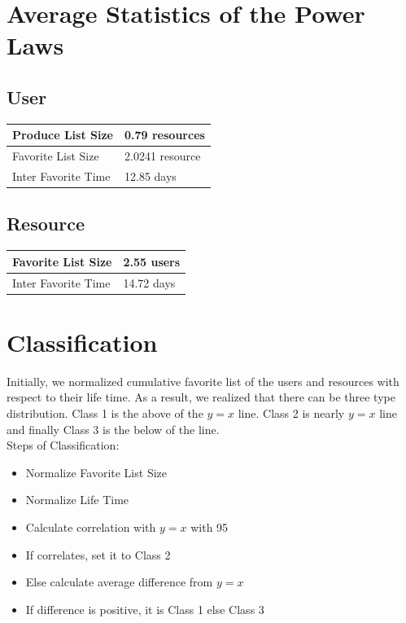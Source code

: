 \documentclass[12pt,a4paper]{report}
\begin{document}
	\clearpage

	\section{Average Statistics of the Power Laws}

	\subsection{User}

	\begin{center}
	\begin{tabular}{|p{5cm}|p{5cm}|}
	\hline
	Produce List Size & 0.79 resources\\
	\hline
	Favorite List Size & 2.0241 resource\\
	\hline
	Inter Favorite Time & 12.85 days\\
	\hline
	\end{tabular}
	\end{center}

	\subsection{Resource}

	\begin{center}
	\begin{tabular}{|p{5cm}|p{5cm}|}
	\hline
	Favorite List Size & 2.55 users\\
	\hline
	Inter Favorite Time & 14.72 days\\
	\hline
	\end{tabular}
	\end{center}	

	\section{Classification}

	\par \hspace{0.6cm} Initially, we normalized cumulative favorite list of the users and resources with respect to their life time. As a result, we realized that there can be three type distribution. Class 1 is the above of the $y = x$ line. Class 2 is nearly $y = x$ line and finally Class 3 is the below of the line.  \\

	\large{Steps of Classification:}
	\normalsize
	\begin{itemize}
	\item Normalize Favorite List Size
	\item Normalize Life Time
	\item Calculate correlation with $y = x$ with 95%
	\item If correlates, set it to Class 2
	\item Else calculate average difference from $ y = x $
	\item If difference is positive, it is Class 1 else Class 3
	\end{itemize}
\end{document}
